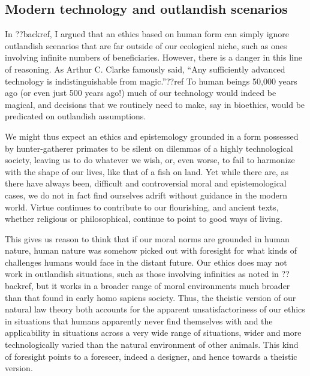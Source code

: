 \subsection{Modern technology and outlandish scenarios}
In ??backref, I argued that an ethics based on human form can simply ignore outlandish scenarios
that are far outside of our ecological niche, such as ones involving infinite numbers of
beneficiaries. However, there is a danger in this line of reasoning. As Arthur C. Clarke famously
said, ``Any sufficiently advanced technology is indistinguishable from magic.''??ref To human beings
50,000 years ago (or even just 500 years ago!) much of our technology would indeed be magical, and 
decisions that we routinely need to make, say in bioethics, would be predicated on outlandish assumptions. 

We might thus expect an ethics and epistemology grounded in a form possessed by hunter-gatherer primates
to be silent on dilemmas of a highly technological society, leaving us to do whatever we wish, or, even worse, 
to fail to harmonize with the shape of our lives, like that of a fish on land. Yet while there are, as there 
have always been, difficult and controversial moral and epistemological cases, we do not in fact find 
ourselves adrift without guidance in the modern world. Virtue continues to contribute to our flourishing,
and ancient texts, whether religious or philosophical, continue to point to good ways of living. 

This gives us reason to think that if our moral norms are grounded in human nature, human nature was somehow
picked out with foresight for what kinds of challenges humans would face in the distant future. Our ethics
does may not work in outlandish situations, such as those involving infinities as noted in ??backref, but it works in a
broader range of moral environments much broader than that found in early homo sapiens society. Thus, the theistic
version of our natural law theory both accounts for the apparent unsatisfactoriness of our ethics in situations that
humans apparently never find themselves with and the applicability in situations across a very wide range of situations,
wider and more technologically varied than the natural environment of other animals. This kind of foresight points to
a foreseer, indeed a designer, and hence towards a theistic version.

